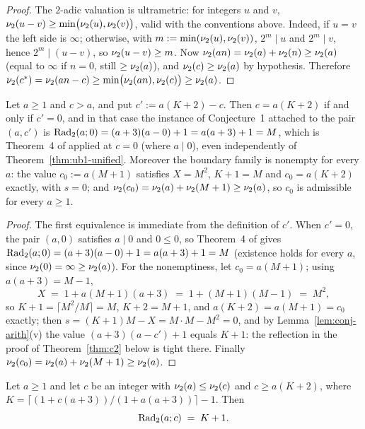 \begin{proof}
The $2$-adic valuation is ultrametric: for integers $u$ and $v$,
$\nu_2(u - v) \ge \min\bigl(\nu_2(u), \nu_2(v)\bigr)$, valid with the
conventions above. Indeed, if $u = v$ the left side is $\infty$;
otherwise, with $m := \min(\nu_2(u), \nu_2(v))$, $2^m \mid u$ and
$2^m \mid v$, hence $2^m \mid (u - v)$, so $\nu_2(u - v) \ge m$. Now
$\nu_2(an) = \nu_2(a) + \nu_2(n) \ge \nu_2(a)$ (equal to $\infty$ if
$n = 0$, still $\ge \nu_2(a)$), and $\nu_2(c) \ge \nu_2(a)$ by hypothesis.
Therefore
$\nu_2(c^*) = \nu_2(an - c) \ge \min\bigl(\nu_2(an), \nu_2(c)\bigr)
\ge \nu_2(a)$.
\end{proof}

\begin{lemma}[the boundary case $c = a(K+2)$]\label{lem:conj-boundary}
Let $a \ge 1$ and $c > a$, and put $c' := a(K+2) - c$. Then $c = a(K+2)$
if and only if $c' = 0$, and in that case the instance of Conjecture~1
attached to the pair $(a, c')$ is
$\mathrm{Rad}_2(a;0) = (a+3)(a - 0) + 1 = a(a+3) + 1 = M$, which is Theorem~4 of
\cite{DT2020} applied at $c = 0$ (where $a \mid 0$), even independently of
Theorem~\ref{thm:ub1-unified}. Moreover the boundary family is nonempty
for every $a$: the value $c_0 := a(M+1)$ satisfies $X = M^2$, $K + 1 = M$
and $c_0 = a(K+2)$ exactly, with $s = 0$; and
$\nu_2(c_0) = \nu_2(a) + \nu_2(M+1) \ge \nu_2(a)$, so $c_0$ is admissible
for every $a \ge 1$.
\end{lemma}

\begin{proof}
The first equivalence is immediate from the definition of $c'$. When
$c' = 0$, the pair $(a, 0)$ satisfies $a \mid 0$ and $0 \le 0$, so
Theorem~4 of \cite{DT2020} gives
$\mathrm{Rad}_2(a;0) = (a+3)(a-0) + 1 = a(a+3) + 1 = M$ (existence holds for every
$a$, since $\nu_2(0) = \infty \ge \nu_2(a)$). For the nonemptiness, let
$c_0 = a(M+1)$; using $a(a+3) = M - 1$,
\[
X \;=\; 1 + a(M+1)(a+3) \;=\; 1 + (M+1)(M-1) \;=\; M^2 ,
\]
so $K + 1 = \lceil M^2/M \rceil = M$, $K + 2 = M + 1$, and
$a(K+2) = a(M+1) = c_0$ exactly; then
$s = (K+1)M - X = M \cdot M - M^2 = 0$, and by
Lemma~\ref{lem:conj-arith}(v) the value $(a+3)(a - c') + 1$ equals $K+1$:
the reflection in the proof of Theorem~\ref{thm:c2} below is tight there.
Finally $\nu_2(c_0) = \nu_2(a) + \nu_2(M+1) \ge \nu_2(a)$.
\end{proof}

\begin{theorem}\label{thm:c2}
Let $a \ge 1$ and let $c$ be an integer with $\nu_2(a) \le \nu_2(c)$ and
$c \ge a(K+2)$, where
$K = \bigl\lceil (1 + c(a+3)) / (1 + a(a+3)) \bigr\rceil - 1$. Then
\[
\mathrm{Rad}_2(a;c) \;=\; K + 1 .
\]
\end{theorem}

